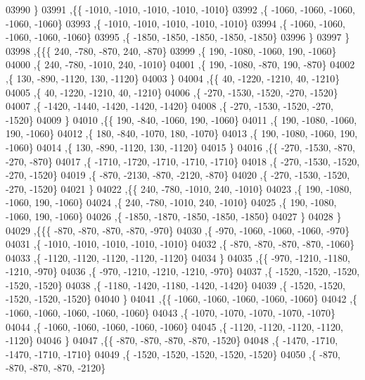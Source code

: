 \begin{DoxyCode}
03990     \}
03991    ,\{\{ -1010, -1010, -1010, -1010, -1010\}
03992     ,\{ -1060, -1060, -1060, -1060, -1060\}
03993     ,\{ -1010, -1010, -1010, -1010, -1010\}
03994     ,\{ -1060, -1060, -1060, -1060, -1060\}
03995     ,\{ -1850, -1850, -1850, -1850, -1850\}
03996     \}
03997    \}
03998   ,\{\{\{   240,  -780,  -870,   240,  -870\}
03999     ,\{   190, -1080, -1060,   190, -1060\}
04000     ,\{   240,  -780, -1010,   240, -1010\}
04001     ,\{   190, -1080,  -870,   190,  -870\}
04002     ,\{   130,  -890, -1120,   130, -1120\}
04003     \}
04004    ,\{\{    40, -1220, -1210,    40, -1210\}
04005     ,\{    40, -1220, -1210,    40, -1210\}
04006     ,\{  -270, -1530, -1520,  -270, -1520\}
04007     ,\{ -1420, -1440, -1420, -1420, -1420\}
04008     ,\{  -270, -1530, -1520,  -270, -1520\}
04009     \}
04010    ,\{\{   190,  -840, -1060,   190, -1060\}
04011     ,\{   190, -1080, -1060,   190, -1060\}
04012     ,\{   180,  -840, -1070,   180, -1070\}
04013     ,\{   190, -1080, -1060,   190, -1060\}
04014     ,\{   130,  -890, -1120,   130, -1120\}
04015     \}
04016    ,\{\{  -270, -1530,  -870,  -270,  -870\}
04017     ,\{ -1710, -1720, -1710, -1710, -1710\}
04018     ,\{  -270, -1530, -1520,  -270, -1520\}
04019     ,\{  -870, -2130,  -870, -2120,  -870\}
04020     ,\{  -270, -1530, -1520,  -270, -1520\}
04021     \}
04022    ,\{\{   240,  -780, -1010,   240, -1010\}
04023     ,\{   190, -1080, -1060,   190, -1060\}
04024     ,\{   240,  -780, -1010,   240, -1010\}
04025     ,\{   190, -1080, -1060,   190, -1060\}
04026     ,\{ -1850, -1870, -1850, -1850, -1850\}
04027     \}
04028    \}
04029   ,\{\{\{  -870,  -870,  -870,  -870,  -970\}
04030     ,\{  -970, -1060, -1060, -1060,  -970\}
04031     ,\{ -1010, -1010, -1010, -1010, -1010\}
04032     ,\{  -870,  -870,  -870,  -870, -1060\}
04033     ,\{ -1120, -1120, -1120, -1120, -1120\}
04034     \}
04035    ,\{\{  -970, -1210, -1180, -1210,  -970\}
04036     ,\{  -970, -1210, -1210, -1210,  -970\}
04037     ,\{ -1520, -1520, -1520, -1520, -1520\}
04038     ,\{ -1180, -1420, -1180, -1420, -1420\}
04039     ,\{ -1520, -1520, -1520, -1520, -1520\}
04040     \}
04041    ,\{\{ -1060, -1060, -1060, -1060, -1060\}
04042     ,\{ -1060, -1060, -1060, -1060, -1060\}
04043     ,\{ -1070, -1070, -1070, -1070, -1070\}
04044     ,\{ -1060, -1060, -1060, -1060, -1060\}
04045     ,\{ -1120, -1120, -1120, -1120, -1120\}
04046     \}
04047    ,\{\{  -870,  -870,  -870,  -870, -1520\}
04048     ,\{ -1470, -1710, -1470, -1710, -1710\}
04049     ,\{ -1520, -1520, -1520, -1520, -1520\}
04050     ,\{  -870,  -870,  -870,  -870, -2120\}

\end{DoxyCode}
